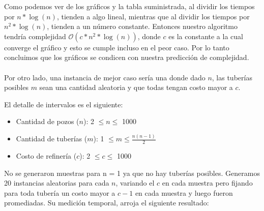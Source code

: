 Como podemos ver de los gráficos y la tabla suministrada, al dividir los tiempos por $n* \log(n)$, tienden a algo lineal, mientras que al dividir los tiempos por $n^2* \log(n)$, tienden a un número constante. Entonces nuestro algoritmo tendría complejidad $\mathcal{O}(c*n^2* \log(n))$, donde $c$ es la constante a la cual converge el gráfico y esto se cumple incluso en el peor caso. Por lo tanto concluimos que los gráficos se condicen con nuestra predicción de complejidad. \\
\\

Por otro lado, una instancia de mejor caso sería una donde dado $n$, las tuberías posibles $m$ sean una cantidad aleatoria y que todas tengan costo mayor a $c$.

El detalle de intervalos es el siguiente:
\begin{itemize}
	\item Cantidad de pozos ($n$): 2 $\leq n \leq$ 1000
    \item Cantidad de tuberías ($m$): 1 $\leq m \leq \frac{n(n-1)}{2}$
    \item Costo de refinería ($c$): 2 $\leq c \leq$ 1000
\end{itemize}

No se generaron muestras para n = 1 ya que no hay tuberías posibles.
Generamos 20 instancias aleatorias para cada $n$, variando el $c$ en cada muestra pero fijando para toda tubería un costo mayor a $c-1$ en cada muestra y luego fueron promediadas. Su medición temporal, arroja el siguiente resultado:

